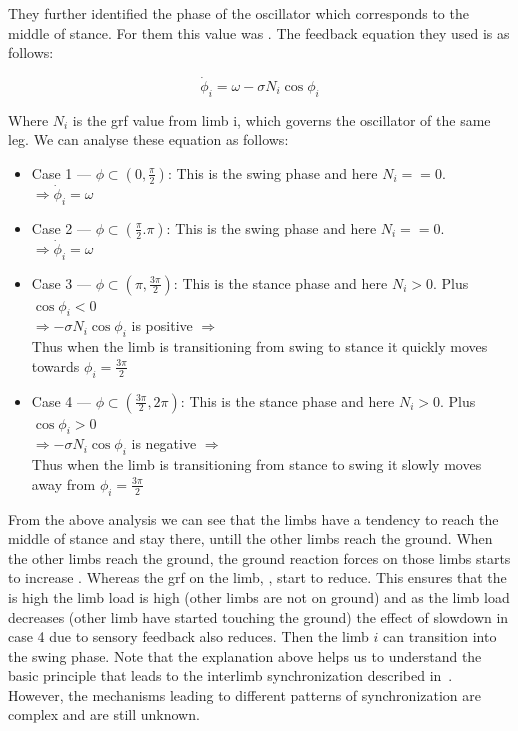 \documentclass{cmc}
\begin{document}
They further identified the phase of the oscillator which corresponds to the middle of stance.
For them this value was  . The feedback equation
they used is as follows:

\begin{equation}
  \label{eq:output_fb}
  \dot\phi_i = \omega - \sigma N_i \cos\phi_i
\end{equation}

Where $N_i$ is the grf value from limb i, which governs the oscillator of the same leg. We can
analyse these equation as follows:

\begin{itemize}
  \item Case 1 --- $\phi \subset (0, \frac{\pi}{2})$: This is the swing phase and here $N_i == 0$. \\
        $ \Rightarrow \dot\phi_i = \omega $
  \item Case 2 --- $\phi \subset (\frac{\pi}{2}. \pi)$: This is the swing phase and here $N_i == 0$. \\
        $\Rightarrow \dot\phi_i = \omega $
  \item Case 3 --- $\phi \subset (\pi, \frac{3\pi}{2})$: This is the stance phase and here $N_i > 0$. Plus $\cos\phi_i < 0$ \\
        $ \Rightarrow -\sigma N_i \cos\phi_i$ is positive $\Rightarrow$  \\
        Thus when the limb is transitioning from swing to stance it quickly moves towards $\phi_i = \frac{3\pi}{2}$
  \item Case 4 --- $\phi \subset (\frac{3\pi}{2}, 2\pi)$: This is the stance phase and here $N_i > 0$. Plus $\cos\phi_i > 0$ \\
        $ \Rightarrow -\sigma N_i \cos\phi_i$ is negative $\Rightarrow$  \\
        Thus when the limb is transitioning from stance to swing it slowly moves away from $\phi_i = \frac{3\pi}{2}$
\end{itemize}

From the above analysis we can see that the limbs have a tendency to reach the middle of stance and stay there, untill the other limbs
reach the ground. When the other limbs reach the ground, the ground reaction forces  on those limbs starts to increase
 . Whereas the grf on the limb, , start to reduce.
 This ensures that the  is high the limb load  is high (other limbs are not on ground) and as the limb
 load decreases (other limb have started touching the ground) the effect of slowdown in case 4 due to sensory feedback also reduces. Then the limb $i$
 can transition into the swing phase. Note that the explanation above helps us to understand the basic principle that leads to the interlimb synchronization described in~\cite{owaki2013simple}. However, the mechanisms leading to different patterns of synchronization are complex and are still unknown.
\end{document}
